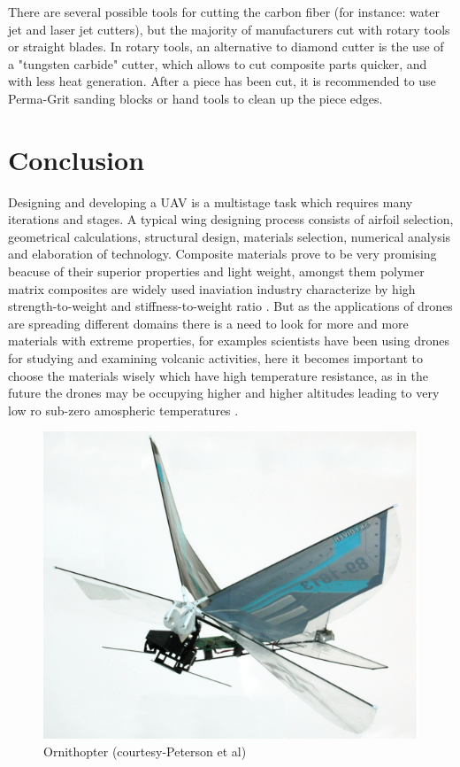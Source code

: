\documentclass{article}
\begin{document}
There are several possible tools for cutting the carbon fiber (for instance: water jet and laser jet cutters), but the majority of manufacturers cut with rotary tools or straight blades. In rotary tools, an alternative to diamond cutter is the use of a "tungsten carbide" cutter, which allows to cut composite parts quicker, and  with less heat generation. After a piece has been cut, it is recommended to use Perma-Grit sanding blocks or hand tools to clean up the piece edges. 


\section{Conclusion}
Designing and developing a UAV is a multistage task which requires many iterations and stages. A typical wing designing process consists of airfoil selection, geometrical calculations, structural design, materials selection, numerical analysis and elaboration of technology. Composite materials prove to be very promising beacuse of their superior properties and light weight, amongst them polymer matrix composites are widely used inaviation industry characterize by high strength-to-weight and stiffness-to-weight ratio \citep{Grodzki}. But as the applications of drones are spreading different domains there is a need to look for more and more materials with extreme properties, for examples scientists have been using drones for studying and examining volcanic activities, here it becomes important to choose the materials wisely which have high temperature resistance, as in the future the drones may be occupying higher and higher altitudes leading to very low ro sub-zero amospheric temperatures .


\begin{figure}[h!]
\centering
\includegraphics[scale=0.3]{dfm1}
\caption{Ornithopter (courtesy-Peterson et al)}
\end{figure}





\end{document}
